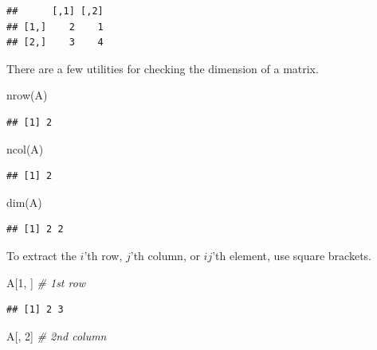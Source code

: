 \documentclass[
  12pt,
  oneside,openany]{book}
\newenvironment{Shaded}{\begin{snugshade}}{\end{snugshade}}
\newcommand{\CommentTok}[1]{\textcolor[rgb]{0.56,0.35,0.01}{\textit{#1}}}
\newcommand{\DecValTok}[1]{\textcolor[rgb]{0.00,0.00,0.81}{#1}}
\newcommand{\FunctionTok}[1]{\textcolor[rgb]{0.00,0.00,0.00}{#1}}
\newcommand{\NormalTok}[1]{#1}
\begin{document}
\begin{verbatim}
##      [,1] [,2]
## [1,]    2    1
## [2,]    3    4
\end{verbatim}

There are a few utilities for checking the dimension of a matrix.

\begin{Shaded}
\begin{Highlighting}[]
\FunctionTok{nrow}\NormalTok{(A)}
\end{Highlighting}
\end{Shaded}

\begin{verbatim}
## [1] 2
\end{verbatim}

\begin{Shaded}
\begin{Highlighting}[]
\FunctionTok{ncol}\NormalTok{(A)}
\end{Highlighting}
\end{Shaded}

\begin{verbatim}
## [1] 2
\end{verbatim}

\begin{Shaded}
\begin{Highlighting}[]
\FunctionTok{dim}\NormalTok{(A)}
\end{Highlighting}
\end{Shaded}

\begin{verbatim}
## [1] 2 2
\end{verbatim}

To extract the \(i\)'th row, \(j\)'th column, or \(ij\)'th element, use square brackets.

\begin{Shaded}
\begin{Highlighting}[]
\NormalTok{A[}\DecValTok{1}\NormalTok{, ]   }\CommentTok{\# 1st row}
\end{Highlighting}
\end{Shaded}

\begin{verbatim}
## [1] 2 3
\end{verbatim}

\begin{Shaded}
\begin{Highlighting}[]
\NormalTok{A[, }\DecValTok{2}\NormalTok{]   }\CommentTok{\# 2nd column}
\end{Highlighting}
\end{Shaded}
\end{document}
